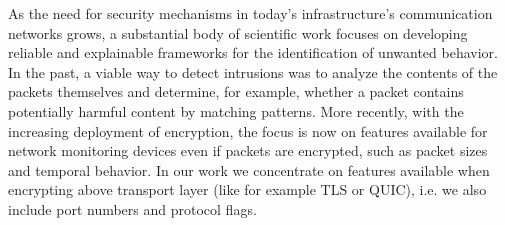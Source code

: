\documentclass[conference]{IEEEtran}
\begin{document}

As the need for security mechanisms in today's infrastructure's communication networks grows, a substantial body of scientific work focuses on developing reliable and explainable frameworks for the identification of unwanted behavior. In the past, a viable way to detect intrusions was to analyze the contents of the packets themselves and determine, for example, whether a packet contains potentially harmful content by matching patterns. More recently, with the increasing deployment of encryption, the focus is now on features available for network monitoring devices even if packets are encrypted, such as packet sizes and temporal behavior. In our work we concentrate on features available when encrypting above transport layer (like for example TLS or QUIC), i.e. we also include port numbers and protocol flags.



\end{document}
